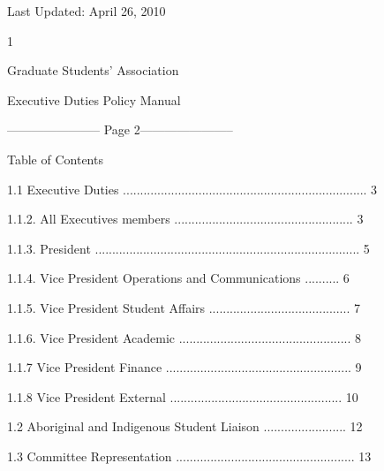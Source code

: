 Last Updated: April 26, 2010  



                                                      1  

                                               

                                             Graduate Students’ Association  

                                            Executive Duties Policy Manual  

  


----------------------- Page 2-----------------------

                                               Table of Contents  

                                                 

  

1.1        Executive Duties ....................................................................... 3  



    1.1.2.         All Executives members .................................................... 3  



    1.1.3.         President ............................................................................. 5  



    1.1.4.         Vice President Operations and Communications .......... 6  



    1.1.5.         Vice President Student Affairs ......................................... 7  



    1.1.6.         Vice President Academic .................................................. 8  



    1.1.7          Vice President Finance ...................................................... 9  



    1.1.8          Vice President External .................................................. 10  



1.2        Aboriginal and Indigenous Student Liaison ........................ 12  



1.3        Committee Representation .................................................... 13  



